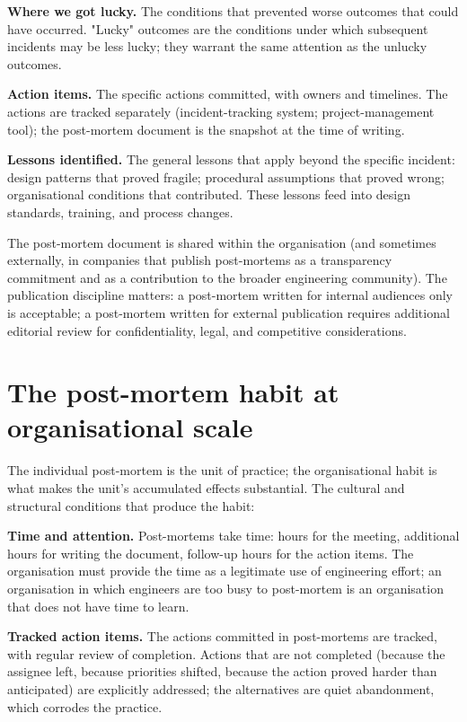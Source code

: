 \textbf{Where we got lucky.} The conditions that prevented worse outcomes that could have occurred. "Lucky" outcomes are the conditions under which subsequent incidents may be less lucky; they warrant the same attention as the unlucky outcomes.

\textbf{Action items.} The specific actions committed, with owners and timelines. The actions are tracked separately (incident-tracking system; project-management tool); the post-mortem document is the snapshot at the time of writing.

\textbf{Lessons identified.} The general lessons that apply beyond the specific incident: design patterns that proved fragile; procedural assumptions that proved wrong; organisational conditions that contributed. These lessons feed into design standards, training, and process changes.

The post-mortem document is shared within the organisation (and sometimes externally, in companies that publish post-mortems as a transparency commitment and as a contribution to the broader engineering community). The publication discipline matters: a post-mortem written for internal audiences only is acceptable; a post-mortem written for external publication requires additional editorial review for confidentiality, legal, and competitive considerations.

\section{The post-mortem habit at organisational scale}

The individual post-mortem is the unit of practice; the organisational habit is what makes the unit's accumulated effects substantial. The cultural and structural conditions that produce the habit:

\textbf{Time and attention.} Post-mortems take time: hours for the meeting, additional hours for writing the document, follow-up hours for the action items. The organisation must provide the time as a legitimate use of engineering effort; an organisation in which engineers are too busy to post-mortem is an organisation that does not have time to learn.

\textbf{Tracked action items.} The actions committed in post-mortems are tracked, with regular review of completion. Actions that are not completed (because the assignee left, because priorities shifted, because the action proved harder than anticipated) are explicitly addressed; the alternatives are quiet abandonment, which corrodes the practice.


